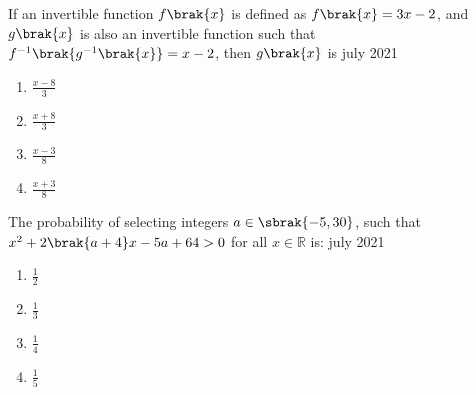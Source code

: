     \item If an invertible function $f\brak{x}$ is defined as $f\brak{x} = 3x - 2$, and $g\brak{x}$ is also an invertible function such that $f^{-1}\brak{g^{-1}\brak{x}} = x - 2$, then $g\brak{x}$ is \hfill{july 2021}
    
        \begin{multicols}{4}
        \begin{enumerate}
        \item $\frac{x - 8}{3}$
        \item $\frac{x + 8}{3}$
        \item $\frac{x - 3}{8}$
        \item $\frac{x + 3}{8}$
        \end{enumerate}
        \end{multicols}
        
    \item The probability of selecting integers $a \in \sbrak{-5, 30}$, such that $x^2 + 2\brak{a + 4}x - 5a + 64 > 0$ for all $x \in \mathbb{R}$ is: \hfill{july 2021}
    
        \begin{multicols}{4}
        \begin{enumerate}
        \item $\frac{1}{2}$
        \item $\frac{1}{3}$
        \item $\frac{1}{4}$
        \item $\frac{1}{5}$
        \end{enumerate}
        \end{multicols}
        
    
       
        
    
   

